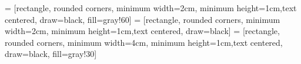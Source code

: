 \documentclass[gmd, manuscript]{copernicus}
\begin{document}









\clearpage
{} = [rectangle, rounded corners, minimum width=2cm, minimum height=1cm,text centered, draw=black, fill=gray!60]
 = [rectangle, rounded corners, minimum width=2cm, minimum height=1cm,text centered, draw=black]
 = [rectangle, rounded corners, minimum width=4cm, minimum height=1cm,text centered, draw=black, fill=gray!30]
\end{document}
